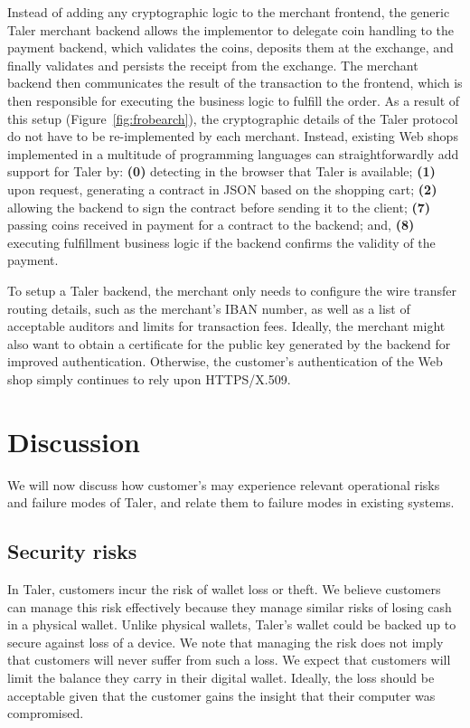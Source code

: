 \documentclass{llncs}
\begin{document}
Instead of adding any cryptographic logic to the merchant frontend,
the generic Taler merchant backend allows the implementor to delegate
coin handling to the payment backend, which validates the coins,
deposits them at the exchange, and finally validates and persists the
receipt from the exchange.  The merchant backend then communicates the
result of the transaction to the front\-end, which is then responsible
for executing the business logic to fulfill the order.  As a result of
this setup (Figure~\ref{fig:frobearch}), the cryptographic details
of the Taler protocol do not have to be re-implemented by each
merchant.  Instead, existing Web shops implemented in a multitude of
programming languages can straightforwardly add support for Taler by:
{\bf (0)} detecting in the browser that Taler is available; {\bf (1)}
upon request, generating a contract in JSON based on the shopping
cart; {\bf (2)} allowing the backend to sign the contract before
sending it to the client; {\bf (7)} passing coins received in payment
for a contract to the backend; and, {\bf (8)} executing fulfillment
business logic if the backend confirms the validity of the payment.

To setup a Taler backend, the merchant only needs to configure the
wire transfer routing details, such as the merchant's IBAN number, as
well as a list of acceptable auditors and limits for transaction fees.
Ideally, the merchant might also want to obtain a certificate for the
public key generated by the backend for improved authentication.
Otherwise, the customer's authentication of the Web shop simply
continues to rely upon HTTPS/X.509.


\section{Discussion}

We will now discuss how customer's may experience relevant operational
risks and failure modes of Taler, and relate them to failure modes
in existing systems.

\subsection{Security risks}

In Taler, customers incur the risk of wallet loss or theft.  We
believe customers can manage this risk effectively because they manage
similar risks of losing cash in a physical wallet.  Unlike physical
wallets, Taler's wallet could be backed up to secure against loss of a
device.  We note that managing the risk does not imply that customers
will never suffer from such a loss.  We expect that customers will
limit the balance they carry in their digital wallet.  Ideally, the
loss should be acceptable given that the customer gains the insight
that their computer was compromised.
\end{document}
